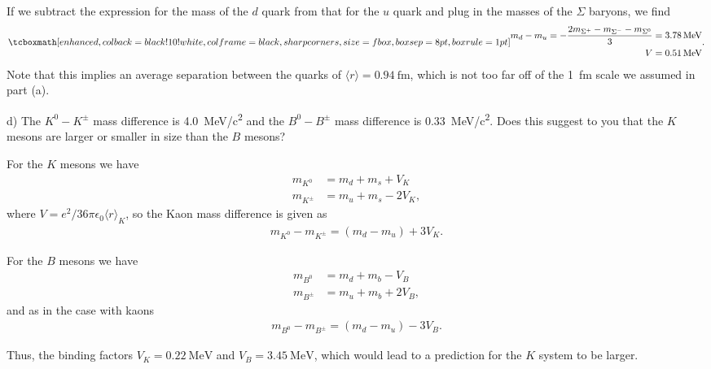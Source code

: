 If we subtract the expression for the mass of the $d$ quark from that for the $u$ quark and plug in the masses of the $\Sigma$ baryons, we find
\begin{eqnarray}
    \label{eq:mass-diff_binding}
    \eqbox{
        \begin{aligned}
            m_{d} - m_{u} = -\frac{2m_{\Sigma^{+}} - m_{\Sigma^{-}} - m_{\Sigma^{0}}}{3} &= \SI{3.78}{\MeV} \\
            V &= \SI{0.51}{\MeV}
        \end{aligned}
}
.\end{eqnarray}
Note that this implies an average separation between the quarks of $\langle r \rangle = \SI{0.94}{\femto\m}$, which is not too far off of the \SI{1}{\femto\m} scale we assumed in part (a).


d) The $K^{0} - K^{\pm}$ mass difference is \SI{4.0}{\MeV / c^2} and the $B^{0} - B^{\pm}$ mass difference is \SI{0.33}{\MeV / c^2}.
Does this suggest to you that the $K$ mesons are larger or smaller in size than the $B$ mesons?

For the $K$ mesons we have
\begin{align}
    \label{eq:K-mass}
    m_{K^{0}} &= m_{d} + m_{s} + V_{K} \\
    m_{K^{\pm}} &= m_{u} + m_{s} - 2V_{K}
,\end{align}
where $V=e^2/36\pi\epsilon_0\langle r \rangle_{K}$, so the Kaon mass difference is given as
\begin{eqnarray}
    \label{eq:K-mass-diff}
    m_{K^{0}} - m_{K^{\pm}} = (m_{d} - m_{u}) + 3V_{K}
.\end{eqnarray}

For the $B$ mesons we have
\begin{align}
    \label{eq:B-mass} 
    m_{B^{0}} &= m_{d} + m_{b} - V_{B} \\
    m_{B^{\pm}} &= m_{u} + m_{b} + 2V_{B}
,\end{align}
and as in the case with kaons
\begin{eqnarray}
    \label{eq:B-mass-diff}
    m_{B^{0}} - m_{B^{\pm}} = (m_{d} - m_{u}) - 3V_{B}
.\end{eqnarray}

Thus, the binding factors $V_{K} = \SI{0.22}{\MeV}$ and $V_{B} = \SI{3.45}{\MeV}$, which would lead to a prediction for the $K$ system to be larger.



